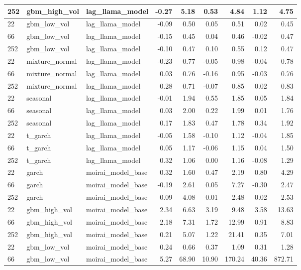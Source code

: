 {\begin{tabular}{lllrrrrrr}
252 & gbm\_high\_vol & lag\_llama\_model & -0.27 & 5.18 & 0.53 & 4.84 & 1.12 & 4.75 \\
\midrule
22 & gbm\_low\_vol & lag\_llama\_model & -0.09 & 0.50 & 0.05 & 0.51 & 0.02 & 0.45 \\
66 & gbm\_low\_vol & lag\_llama\_model & -0.15 & 0.45 & 0.04 & 0.46 & -0.02 & 0.47 \\
252 & gbm\_low\_vol & lag\_llama\_model & -0.10 & 0.47 & 0.10 & 0.55 & 0.12 & 0.47 \\
\midrule
22 & mixture\_normal & lag\_llama\_model & -0.23 & 0.77 & -0.05 & 0.98 & -0.04 & 0.78 \\
66 & mixture\_normal & lag\_llama\_model & 0.03 & 0.76 & -0.16 & 0.95 & -0.03 & 0.76 \\
252 & mixture\_normal & lag\_llama\_model & 0.28 & 0.71 & -0.07 & 0.85 & 0.02 & 0.83 \\
\midrule
22 & seasonal & lag\_llama\_model & -0.01 & 1.94 & 0.55 & 1.85 & 0.05 & 1.84 \\
66 & seasonal & lag\_llama\_model & 0.03 & 2.00 & 0.22 & 1.99 & 0.01 & 1.76 \\
252 & seasonal & lag\_llama\_model & 0.17 & 1.83 & 0.47 & 1.78 & 0.34 & 1.92 \\
\midrule
22 & t\_garch & lag\_llama\_model & -0.05 & 1.58 & -0.10 & 1.12 & -0.04 & 1.85 \\
66 & t\_garch & lag\_llama\_model & 0.05 & 1.17 & -0.06 & 1.15 & 0.04 & 1.50 \\
252 & t\_garch & lag\_llama\_model & 0.32 & 1.06 & 0.00 & 1.16 & -0.08 & 1.29 \\
\midrule
22 & garch & moirai\_model\_base & 0.32 & 1.60 & 0.47 & 2.19 & 0.80 & 4.29 \\
66 & garch & moirai\_model\_base & -0.19 & 2.61 & 0.05 & 7.27 & -0.30 & 2.47 \\
252 & garch & moirai\_model\_base & 0.09 & 4.08 & 0.01 & 2.48 & 0.02 & 2.53 \\
\midrule
22 & gbm\_high\_vol & moirai\_model\_base & 2.34 & 6.63 & 3.19 & 9.48 & 3.58 & 13.63 \\
66 & gbm\_high\_vol & moirai\_model\_base & 2.18 & 7.31 & 1.72 & 12.99 & 0.91 & 8.83 \\
252 & gbm\_high\_vol & moirai\_model\_base & 0.21 & 5.07 & 1.22 & 21.41 & 0.35 & 7.01 \\
\midrule
22 & gbm\_low\_vol & moirai\_model\_base & 0.24 & 0.66 & 0.37 & 1.09 & 0.31 & 1.28 \\
66 & gbm\_low\_vol & moirai\_model\_base & 5.27 & 68.90 & 10.90 & 170.24 & 40.36 & 872.71 \\

\end{tabular}}
